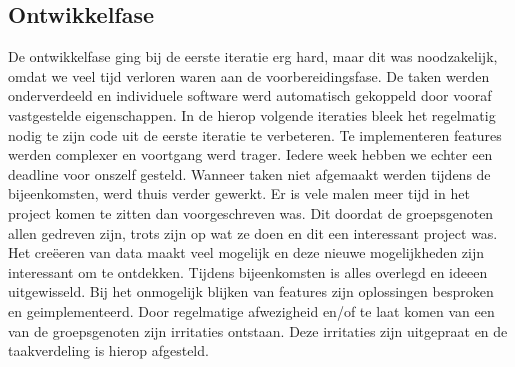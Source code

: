 \documentclass[a4paper,10pt]{article}
\begin{document}
	\subsection{Ontwikkelfase}
	De ontwikkelfase ging bij de eerste iteratie erg hard, maar dit was noodzakelijk, omdat we veel tijd verloren waren aan de voorbereidingsfase. De taken werden onderverdeeld en individuele software werd automatisch gekoppeld door vooraf vastgestelde eigenschappen. In de hierop volgende iteraties bleek het regelmatig nodig te zijn code uit de eerste iteratie te verbeteren. Te implementeren features werden complexer en voortgang werd trager. Iedere week hebben we echter een deadline voor onszelf gesteld. Wanneer taken niet afgemaakt werden tijdens de bijeenkomsten, werd thuis verder gewerkt. Er is vele malen meer tijd in het project komen te zitten dan voorgeschreven was. Dit doordat de groepsgenoten allen gedreven zijn, trots zijn op wat ze doen en dit een interessant project was. Het cre\"eeren van data maakt veel mogelijk en deze nieuwe mogelijkheden zijn interessant om te ontdekken. Tijdens bijeenkomsten is alles overlegd en ideeen uitgewisseld. Bij het onmogelijk blijken van features zijn oplossingen besproken en geimplementeerd. Door regelmatige afwezigheid en/of te laat komen van een van de groepsgenoten zijn irritaties ontstaan. Deze irritaties zijn uitgepraat en de taakverdeling is hierop afgesteld. 
	
\end{document}
